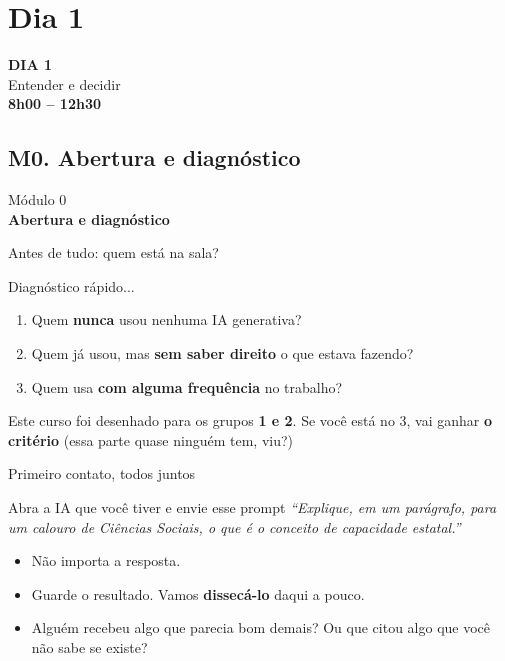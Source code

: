 \documentclass[11pt,aspectratio=169,t]{beamer}
\newcommand{\transicao}[2]{%
  \begin{frame}[plain]
    \centering
    \vspace*{2.2cm}
    {\large\color{cinzaescuro} #1}\\[0.8cm]
    {\Large\color{azulUNI}\textbf{#2}}
  \end{frame}}
\newcommand{\aberturadia}[3]{%
  \begin{frame}[plain]
    \centering
    \vspace*{1.6cm}
    {\Huge\color{azulUNI}\textbf{#1}}\\[0.6cm]
    {\large\color{cinzaescuro} #2}\\[1.2cm]
    {\normalsize\color{laranjaDestaque}\textbf{#3}}
  \end{frame}}
\begin{document}
\section{Dia 1}
\aberturadia{DIA 1}{Entender e decidir}{8h00 -- 12h30}
\subsection{M0. Abertura e diagnóstico}
\transicao{Módulo 0}{Abertura e diagnóstico}
\begin{frame}{Antes de tudo: quem está na sala?}
  \begin{block}{Diagnóstico rápido...}
    \begin{enumerate}
      \item Quem \textbf{nunca} usou nenhuma IA generativa?
      \item Quem já usou, mas \textbf{sem saber direito} o que estava fazendo?
      \item Quem usa \textbf{com alguma frequência} no trabalho?
    \end{enumerate}
  \end{block}
  \pause
  \vfill
  \begin{exampleblock}{}
    \centering Este curso foi desenhado para os grupos \textbf{1 e 2}. Se você está no 3, vai ganhar \textbf{o critério} (essa parte quase ninguém tem, viu?)
  \end{exampleblock}
\end{frame}
\begin{frame}{Primeiro contato, todos juntos}
  \begin{block}{Abra a IA que você tiver e envie esse prompt}
    \centering
    \textit{``Explique, em um parágrafo, para um calouro de Ciências Sociais, o que é o conceito de capacidade estatal.''}
  \end{block}
  \pause
  \vfill
  \begin{itemize}
    \item Não importa a resposta.
    \item Guarde o resultado. Vamos \textbf{dissecá-lo} daqui a pouco.
    \item \alert{Alguém recebeu algo que parecia bom demais? Ou que citou algo que você não sabe se existe?}
  \end{itemize}
\end{frame}
\end{document}
